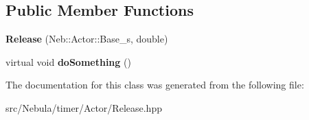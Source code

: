 \subsection*{\-Public \-Member \-Functions}
\begin{DoxyCompactItemize}
\item 
\hypertarget{classneb_1_1Timer_1_1Actor_1_1Release_a5982767efae7b3e6123a87e49eb06f38}{{\bfseries \-Release} (\-Neb\-::\-Actor\-::\-Base\-\_\-s, double)}\label{classneb_1_1Timer_1_1Actor_1_1Release_a5982767efae7b3e6123a87e49eb06f38}

\item 
\hypertarget{classneb_1_1Timer_1_1Actor_1_1Release_aba04f2d6b58f14b55dde7c0f1edeca20}{virtual void {\bfseries do\-Something} ()}\label{classneb_1_1Timer_1_1Actor_1_1Release_aba04f2d6b58f14b55dde7c0f1edeca20}

\end{DoxyCompactItemize}


\-The documentation for this class was generated from the following file\-:\begin{DoxyCompactItemize}
\item 
src/\-Nebula/timer/\-Actor/\-Release.\-hpp\end{DoxyCompactItemize}
